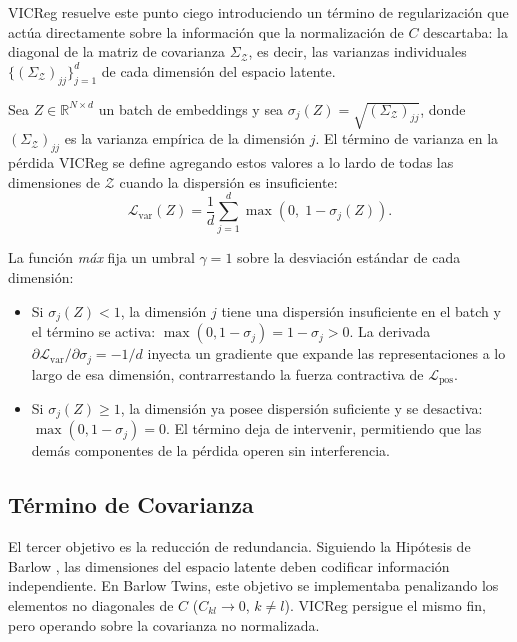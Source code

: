 VICReg resuelve este punto ciego introduciendo un término de regularización que actúa directamente sobre la información que la normalización de $C$ descartaba: la diagonal de la matriz de covarianza $\Sigma_\mathcal{Z}$, es decir, las varianzas individuales $\{(\Sigma_\mathcal{Z})_{jj}\}_{j=1}^d$ de cada dimensión del espacio latente.

\begin{definition}
\label{def:vicreg_varianza}
Sea $Z \in \mathbb{R}^{N \times d}$ un batch de embeddings y sea $\sigma_j(Z) = \sqrt{(\Sigma_\mathcal{Z})_{jj}}$, donde $(\Sigma_\mathcal{Z})_{jj}$ es la varianza empírica de la dimensión $j$. El término de varianza en la pérdida VICReg se define agregando estos valores a lo lardo de todas las dimensiones de $\mathcal{Z}$ cuando la dispersión es insuficiente:
\begin{equation}
\label{eq:vicreg_var}
\mathcal{L}_{\text{var}}(Z) = \frac{1}{d} \sum_{j=1}^{d} \max\left(0, \; 1 - \sigma_j(Z)\right).
\end{equation}
\end{definition}

\noindent La función \textit{máx} fija un umbral $\gamma = 1$ sobre la desviación estándar de cada dimensión:
\begin{itemize}
    \item Si $\sigma_j(Z) < 1$, la dimensión $j$ tiene una dispersión insuficiente en el batch y el término se activa: $\max(0, 1 - \sigma_j) = 1 - \sigma_j > 0$. La derivada $\partial \mathcal{L}_{\text{var}} / \partial \sigma_j = -1/d$ inyecta un gradiente que expande las representaciones a lo largo de esa dimensión, contrarrestando la fuerza contractiva de $\mathcal{L}_{\text{pos}}$.
    \item Si $\sigma_j(Z) \geq 1$, la dimensión ya posee dispersión suficiente y se desactiva: $\max(0, 1 - \sigma_j) = 0$. El término deja de intervenir, permitiendo que las demás componentes de la pérdida operen sin interferencia.
\end{itemize}

\subsection{Término de Covarianza}

El tercer objetivo es la reducción de redundancia. Siguiendo la Hipótesis de Barlow \cite{barlow1961possible}, las dimensiones del espacio latente deben codificar información independiente. En Barlow Twins, este objetivo se implementaba penalizando los elementos no diagonales de $C$ ($C_{kl} \to 0$, $k \neq l$). VICReg persigue el mismo fin, pero operando sobre la covarianza no normalizada.

